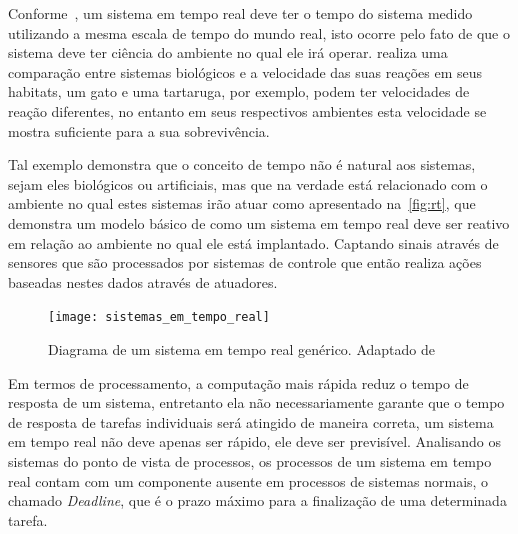 Conforme~, um sistema em tempo real deve ter o tempo do sistema medido utilizando a mesma escala de tempo do mundo real, isto ocorre pelo fato de que o sistema deve ter ciência do ambiente no qual ele irá operar. 
% 
 realiza uma comparação entre sistemas biológicos e a velocidade das suas reações em seus habitats, um gato e uma tartaruga, por exemplo, podem ter velocidades de reação diferentes, no entanto em seus respectivos ambientes esta velocidade se mostra suficiente para a sua sobrevivência. 

Tal exemplo demonstra que o conceito de tempo não é natural aos sistemas, sejam eles biológicos ou artificiais, mas que na verdade está relacionado com o ambiente no qual estes sistemas irão atuar como apresentado na~\autoref{fig:rt}, que demonstra um modelo básico de como um sistema em tempo real deve ser reativo em relação ao ambiente no qual ele está implantado. Captando sinais através de sensores que são processados por sistemas de controle que então realiza ações baseadas nestes dados através de atuadores.~\cite{BUTTAZZO:2011}

\begin{figure}[ht]
	\texttt{[image: sistemas\_em\_tempo\_real]}
    \centering
    \caption{Diagrama de um sistema em tempo real genérico. Adaptado de~}
    \label{fig:rt}
\end{figure}

Em termos de processamento, a computação mais rápida reduz o tempo de resposta de um sistema, entretanto ela não necessariamente garante que o tempo de resposta de tarefas individuais será atingido de maneira correta, um sistema em tempo real não deve apenas ser rápido, ele deve ser previsível. Analisando os sistemas do ponto de vista de processos, os processos de um sistema em tempo real contam com um componente ausente em processos de sistemas normais, o chamado \textit{Deadline}, que é o prazo máximo para a finalização de uma determinada tarefa.\cite{BUTTAZZO:2011}

